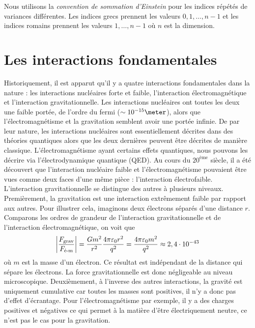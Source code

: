 \documentclass[a4paper,11pt]{report}
\begin{document}
        Nous utilisons la \textit{convention de sommation d'Einstein} pour les indices répétés de variances différentes. Les indices grecs prennent les valeurs $0,1,\dots,n-1$ et les indices romains prennent les valeurs $1,\dots,n-1$ où $n$ est la dimension.

    \section{Les interactions fondamentales}
    
        Historiquement, il est apparut qu'il y a quatre interactions fondamentales dans la nature : les interactions nucléaires forte et faible, l'interaction électromagnétique et l'interaction gravitationnelle. Les interactions nucléaires ont toutes les deux une faible portée, de l'ordre du fermi ($\sim10^{-15}\meter$), alors que  l'électromagnétisme et la gravitation semblent avoir une portée infinie. De par leur nature, les interactions nucléaires sont essentiellement décrites dans des théories quantiques alors que les deux dernières peuvent être décrites de manière classique. L'électromagnétisme ayant certains effets quantiques, nous pouvons les décrire via l'électrodynamique quantique (QED). Au cours du $20^{\text{ème}}$ siècle, il a été découvert que l'interaction nucléaire faible et l'électromagnétisme pouvaient être vues comme deux faces d'une même pièce : l'interaction électrofaible.\\
        
        L'interaction gravitationnelle se distingue des autres à plusieurs niveaux. Premièrement, la gravitation est une interaction extrêmement faible par rapport aux autres. Pour illustrer cela, imaginons deux électrons séparés d'une distance $r$. Comparons les ordres de grandeur de l'interaction gravitationnelle et de l'interaction électromagnétique, on voit que
        \begin{equation}
            \abs{\frac{F_{\text{grav}}}{F_{\text{é-m}}}} = \frac{Gm^2}{r^2}\frac{4\pi\varepsilon_0r^2}{q^2} = \frac{4\pi\varepsilon_0 m^2}{q^2} \approx 2,4\cdot10^{-43}
        \end{equation}
        où $m$ est la masse d'un électron. Ce résultat est indépendant de la distance qui sépare les électrons. La force gravitationnelle est donc négligeable au niveau microscopique. Deuxièmement, à l'inverse des autres interactions, la gravité est uniquement cumulative car toutes les masses sont positives, il n'y a donc pas d'effet d'écrantage. Pour l'électromagnétisme par exemple, il y a des charges positives et négatives ce qui permet à la matière d'être électriquement neutre, ce n'est pas le cas pour la gravitation.\\
        
\end{document}

